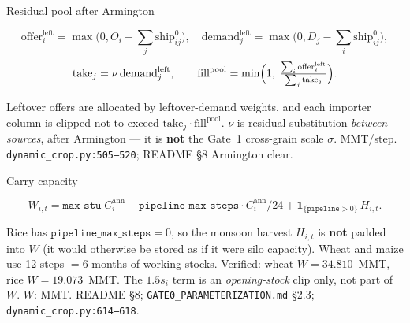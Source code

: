 \begin{frame}{Residual pool after Armington}

\[
\mathrm{offer}^{\mathrm{left}}_i
=\max\bigl(0,O_i-\textstyle\sum_j\mathrm{ship}^0_{ij}\bigr),
\quad
\mathrm{demand}^{\mathrm{left}}_j
=\max\bigl(0,D_j-\textstyle\sum_i\mathrm{ship}^0_{ij}\bigr),
\]
\[
\mathrm{take}_j=\nu\,\mathrm{demand}^{\mathrm{left}}_j,
\qquad
\mathrm{fill}^{\mathrm{pool}}
=\min\Bigl(1,\;
\tfrac{\sum_i\mathrm{offer}^{\mathrm{left}}_i}{\sum_j\mathrm{take}_j}\Bigr).
\]

Leftover offers are allocated by leftover-demand weights, and each
importer column is clipped not to exceed
$\mathrm{take}_j\cdot\mathrm{fill}^{\mathrm{pool}}$. $\nu$ is residual
substitution \emph{between sources}, after Armington --- it is
\textbf{not} the Gate~1 cross-grain scale $\sigma$.
{MMT/step.}
{\texttt{dynamic\_crop.py:505--520}; README \S8 Armington clear.}
\end{frame}

\begin{frame}{Carry capacity}

\[
W_{i,t}
= \mathtt{max\_stu}\; C_i^{\mathrm{ann}}
+ \mathtt{pipeline\_max\_steps}\cdot C_i^{\mathrm{ann}}/24
+ \mathbf{1}_{\{\mathtt{pipeline}>0\}}\, H_{i,t}.
\]

Rice has $\mathtt{pipeline\_max\_steps}=0$, so the monsoon harvest
$H_{i,t}$ is \textbf{not} padded into $W$ (it would otherwise be stored as
if it were silo capacity). Wheat and maize use 12 steps $=6$ months of
working stocks. Verified: wheat $W=34.810$~MMT, rice $W=19.073$~MMT.
The $1.5 s_i$ term is an \emph{opening-stock} clip only, not part of $W$.
{$W$: MMT.}
{README \S8; \texttt{GATE0\_PARAMETERIZATION.md} \S2.3;
\texttt{dynamic\_crop.py:614--618}.}
\end{frame}

